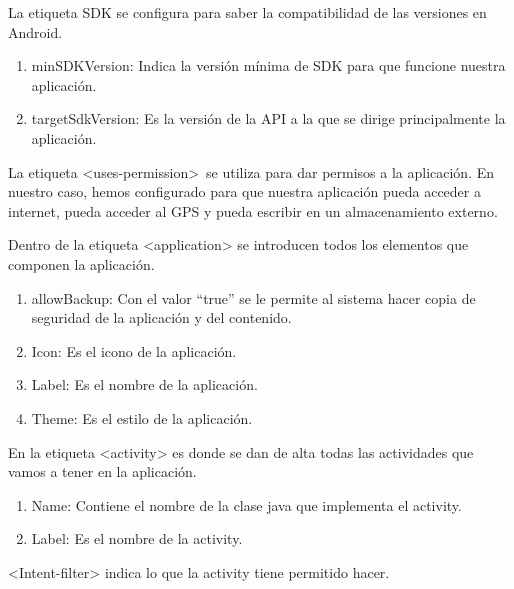 \begin{enumerate}
La etiqueta SDK se configura para saber la compatibilidad de las 
versiones en Android.
\begin{enumerate}
\item minSDKVersion: Indica la versión mínima de SDK para que funcione
 nuestra aplicación.
\item targetSdkVersion: Es la versión de la API a la que se dirige
 principalmente la aplicación.
\end{enumerate}
La etiqueta <uses-permission>~se utiliza para dar permisos a la aplicación.
En nuestro caso, hemos configurado para que nuestra aplicación
pueda acceder a internet, pueda acceder al GPS y pueda escribir 
en un almacenamiento externo.
 
Dentro de la etiqueta <application> se introducen todos los 
elementos que componen la aplicación.
\begin{enumerate}
\item allowBackup: Con el valor ``true'' se le permite al sistema 
hacer copia de seguridad de la aplicación y del contenido.
\item Icon: Es el icono de la aplicación.
\item Label: Es el nombre de la aplicación.
\item Theme: Es el estilo de la aplicación.
\end{enumerate}
En la etiqueta <activity> es donde se dan de alta todas las 
actividades que vamos a tener en la aplicación.
\begin{enumerate}
\item Name: Contiene el nombre de la clase java que implementa el activity.
\item Label: Es el nombre de la activity.
\end{enumerate}
<Intent-filter> indica lo que la activity tiene permitido hacer.
\end{enumerate}
